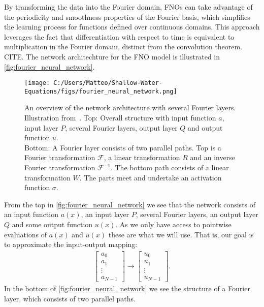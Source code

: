 By transforming the data into the Fourier domain, FNOs can take advantage of the periodicity and smoothness properties of the Fourier basis, which simplifies the learning process for functions defined over continuous domains.
This approach leverages the fact that differentiation with respect to time is equivalent to multiplication in the Fourier domain, distinct from the convolution theorem. CITE.
The network architechture for the FNO model is illustrated in \autoref{fig:fourier_neural_network}.
\begin{figure}[H]
    \centering
    \texttt{[image: C:/Users/Matteo/Shallow-Water-Equations/figs/fourier\_neural\_network.png]}
    \caption{An overview of the network architecture with several Fourier layers. Illustration from~\cite{FNO_2021}.
            Top: Overall structure with input function $a$, input layer $P$, several Fourier layers, output layer $Q$ and output function $u$.\\
            Bottom: A Fourier layer consists of two parallel paths. Top is a Fourier transformation $\mathcal{F}$, a linear transformation $R$ and an inverse Fourier transformation $\mathcal{F}^{-1}$.
            The bottom path consists of a linear transformation $W$. The parts meet and undertake an activation function $\sigma$.}\label{fig:fourier_neural_network}
\end{figure}
From the top in \autoref{fig:fourier_neural_network} we see that the network consists of an input function $a(x)$, an input layer $P$, several Fourier layers, an output layer $Q$ and some output function $u(x)$.
As we only have access to pointwise evaluations of $a(x)$ and $u(x)$ these are what we will use. 
That is, our goal is to approximate the input-output mapping: 
\begin{align*}
    \begin{bmatrix}
        a_0 \\
        a_1 \\
        \vdots \\
        a_{N-1}
    \end{bmatrix}
    \to
    \begin{bmatrix}
        u_0 \\
        u_1 \\
        \vdots \\
        u_{N-1}
    \end{bmatrix}.
\end{align*}
In the bottom of \autoref{fig:fourier_neural_network} we see the structure of a Fourier layer, which consists of two parallel paths.
